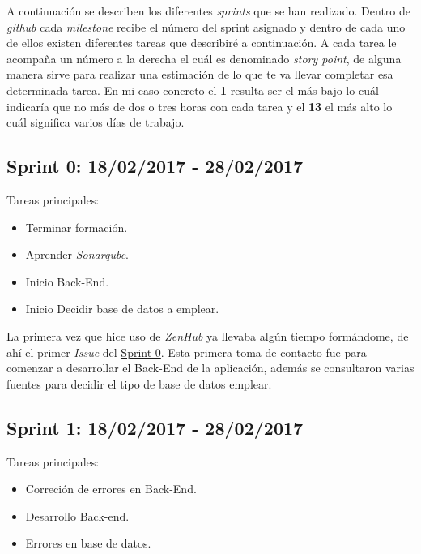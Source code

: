 A continuación se describen los diferentes \emph{sprints} que se han
realizado. Dentro de \emph{github} cada \emph{milestone} recibe el número del sprint asignado y dentro de cada uno de ellos existen diferentes tareas que describiré a continuación. A cada tarea le acompaña un número a la derecha el cuál es denominado \emph{story point}, de alguna manera sirve para realizar una estimación de lo que te va llevar completar esa determinada tarea. En mi caso concreto el \textbf{1} resulta ser el más bajo lo cuál indicaría que no más de dos o tres horas con cada tarea y el  \textbf{13} el más alto lo cuál significa varios días de trabajo.


\subsection{Sprint 0: 18/02/2017 - 28/02/2017}\label{sprint0}

Tareas principales:

\begin{itemize}
	\item Terminar formación.
	\item Aprender \emph{Sonarqube}.
	\item Inicio Back-End.
    \item Inicio Decidir base de datos a emplear.
\end{itemize}


La primera vez que hice uso de \emph{ZenHub} ya llevaba algún tiempo formándome, de ahí el primer \emph{Issue} del \underline{Sprint 0}. Esta primera toma de contacto fue para comenzar a desarrollar el Back-End de la aplicación, además se consultaron varias fuentes para decidir el tipo de base de datos emplear.

\subsection{Sprint 1: 18/02/2017 - 28/02/2017}\label{sprint1}

Tareas principales:

\begin{itemize}
	\item Correción de errores en Back-End.
	\item Desarrollo Back-end.
	\item Errores en base de datos.
\end{itemize}


